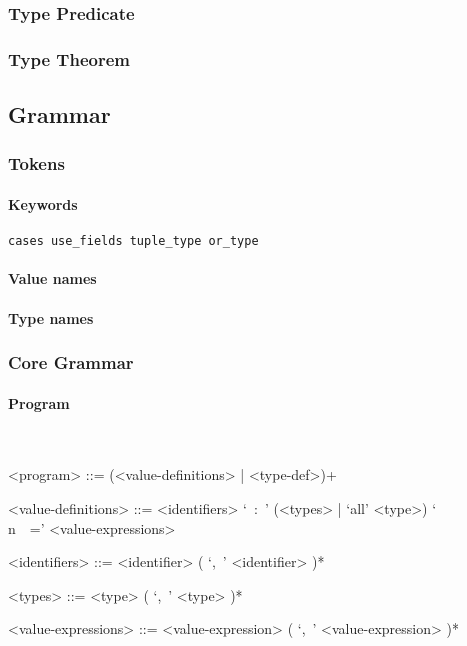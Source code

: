 \documentclass{article}
\begin{document}
\subsubsection{Type Predicate}

\subsubsection{Type Theorem}

\subsection{Grammar}
\subsubsection{Tokens}

\paragraph{Keywords}

\begin{verbatim}
cases use_fields tuple_type or_type
\end{verbatim}

\paragraph{Value names}

\paragraph{Type names}

\subsubsection{Core Grammar}

\setlength{\grammarparsep}{20pt}
\setlength{\grammarindent}{12em}

\paragraph{Program}
\hspace{1cm}\\
\begin{grammar}

<program> ::= (<value-definitions> | <type-def>)+

<value-definitions> ::=
<identifiers> `\ :\ ' (<types> | `all' <type>) `\\n\ \ =' <value-expressions>

<identifiers> ::= <identifier> ( `,\ ' <identifier> )*  

<types> ::= <type> ( `,\ ' <type> )*  

<value-expressions> ::= <value-expression> ( `,\ ' <value-expression> )*  

\end{grammar}
\hspace{1cm}\\
\end{document}
